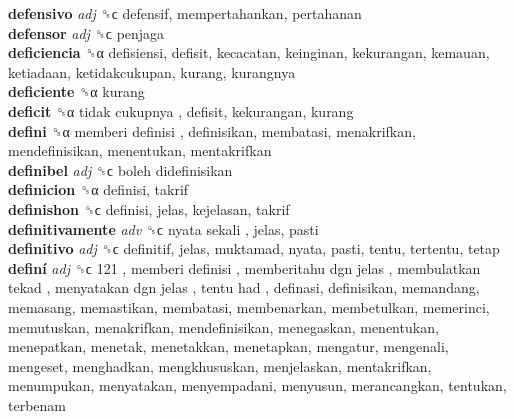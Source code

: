 \textbf{defensivo} \emph{adj}  ␝ϲ  defensif, mempertahankan, pertahanan  \\
\textbf{defensor} \emph{adj}  ␝ϲ  penjaga  \\
\textbf{deficiencia} ␝α  defisiensi, defisit, kecacatan, keinginan, kekurangan, kemauan, ketiadaan, ketidakcukupan, kurang, kurangnya  \\
\textbf{deficiente} ␝α  kurang  \\
\textbf{deficit} ␝α   tidak cukupnya , defisit, kekurangan, kurang  \\
\textbf{defini} ␝α   memberi definisi , definisikan, membatasi, menakrifkan, mendefinisikan, menentukan, mentakrifkan  \\
\textbf{definibel} \emph{adj}  ␝ϲ   boleh didefinisikan   \\
\textbf{definicion} ␝α  definisi, takrif  \\
\textbf{definishon} ␝ϲ  definisi, jelas, kejelasan, takrif  \\
\textbf{definitivamente} \emph{adv}  ␝ϲ   nyata sekali , jelas, pasti  \\
\textbf{definitivo} \emph{adj}  ␝ϲ  definitif, jelas, muktamad, nyata, pasti, tentu, tertentu, tetap  \\
\textbf{definí} \emph{adj}  ␝ϲ   121 ,  memberi definisi ,  memberitahu dgn jelas ,  membulatkan tekad ,  menyatakan dgn jelas ,  tentu had , definasi, definisikan, memandang, memasang, memastikan, membatasi, membenarkan, membetulkan, memerinci, memutuskan, menakrifkan, mendefinisikan, menegaskan, menentukan, menepatkan, menetak, menetakkan, menetapkan, mengatur, mengenali, mengeset, menghadkan, mengkhususkan, menjelaskan, mentakrifkan, menumpukan, menyatakan, menyempadani, menyusun, merancangkan, tentukan, terbenam  \\
